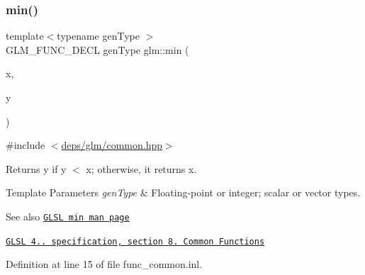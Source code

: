 \subsubsection{\texorpdfstring{min()}{min()}\hspace{0.1cm}{\footnotesize\ttfamily [1/3]}}
{\footnotesize\ttfamily template$<$typename gen\+Type $>$ \\
G\+L\+M\+\_\+\+F\+U\+N\+C\+\_\+\+D\+E\+CL gen\+Type glm\+::min (\begin{DoxyParamCaption}\item[{gen\+Type}]{x,  }\item[{gen\+Type}]{y }\end{DoxyParamCaption})}



{\ttfamily \#include $<$\hyperlink{common_8hpp}{deps/glm/common.\+hpp}$>$}

Returns y if y $<$ x; otherwise, it returns x.


\begin{DoxyTemplParams}{Template Parameters}
{\em gen\+Type} & Floating-\/point or integer; scalar or vector types.\\
\hline
\end{DoxyTemplParams}
\begin{DoxySeeAlso}{See also}
\href{http://www.opengl.org/sdk/docs/manglsl/xhtml/min.xml}{\tt G\+L\+SL min man page} 

\href{http://www.opengl.org/registry/doc/GLSLangSpec.4.20.8.pdf}{\tt G\+L\+SL 4.. specification, section 8. Common Functions} 
\end{DoxySeeAlso}


Definition at line 15 of file func\+\_\+common.\+inl.



